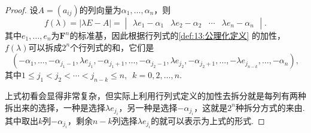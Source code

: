 \begin{proof}
    设$A=(a_{ij})$的列向量为$\alpha_1,\ldots,\alpha_n$，则
    \[f(\lambda)=|\lambda E-A|=\begin{vmatrix}
            \lambda e_1-\alpha_1 & \lambda e_2-\alpha_2 & \cdots & \lambda e_n-\alpha_n
        \end{vmatrix}.\]
    其中$e_1,\ldots,e_n$为$\mathbf{F}^n$的标准基，因此根据行列式的\autoref{def:13:公理化定义} 的加性，$f(\lambda)$可以拆成$2^n$个行列式的和，它们是
    \begin{equation}\label{eq:18:特征多项式展开}
        (-\alpha_1,\ldots,-\alpha_{j_1-1},\lambda e_{j_1},-\alpha_{j_1+1},\ldots,-\alpha_{j_2-1},\lambda e_{j_2},-\alpha_{j_2+1},\ldots,-\lambda e_{j_{n-k}},\ldots,-\alpha_n),
    \end{equation}
    其中$1\leqslant j_1<j_2<\cdots<j_{n-k}\leqslant n,\enspace k=0,2,\ldots,n$.

    上式初看会显得非常复杂，但实际上利用行列式定义的加性去拆分就是每列有两种拆出来的选择，一种是选择$\lambda e_{j_i}$，另一种是选择$-\alpha_{j_i}$，这就是$2^n$种拆分方式的来由. 其中取出$k$列$-\alpha_{j_i}$，剩余$n-k$列选择$\lambda e_{j_i}$的就可以表示为上式的形式.


\end{proof}
